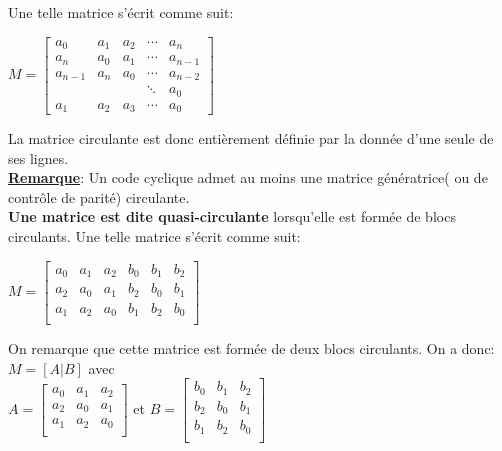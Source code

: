 \documentclass[12pt,openany]{report}
\begin{document}
Une telle matrice s'écrit comme suit: 
\begin{center}


$ M= 
\begin{bmatrix}

a_0 & a_1 & a_2 & \cdots & a_n \\ 
a_n & a_0 & a_1 & \cdots & a_{n-1}\\


a_{n-1} & a_n & a_0&\cdots	& a_{n-2}\\

        &     &   & \ddots & a_0\\
        a_1 & a_2 & a_3 & \cdots & a_0

\end{bmatrix}$
\end{center}
La matrice circulante est donc entièrement définie par la donnée d'une seule de ses lignes.\\
\underline{\textbf{Remarque}}: Un code cyclique admet au moins une matrice génératrice( ou de contrôle de parité) circulante.\\
\textbf{Une matrice est dite quasi-circulante} lorsqu'elle est formée de blocs circulants. Une telle matrice s'écrit comme suit:
\begin{center}


$ 
M = \begin{bmatrix}
a_0 & a_1 & a_2 & b_0 & b_1 & b_2\\

a_2 & a_0 & a_1 & b_2 & b_0 & b_1 \\

a_1 & a_2 & a_0 & b_1 & b_2 & b_0\\
\end{bmatrix}
$
\end{center}
On remarque que cette matrice est formée de deux blocs circulants. On a donc:\\
$ M = \left[ A | B\right] $ avec \\

$ 
A= \begin{bmatrix}
a_0 & a_1 & a_2\\

a_2 & a_0 & a_1 \\

a_1 & a_2 & a_0\\
\end{bmatrix}
$ et  $ 
B = \begin{bmatrix}
 b_0 & b_1 & b_2\\

 b_2 & b_0 & b_1 \\

 b_1 & b_2 & b_0\\
\end{bmatrix}
$
\end{document}
